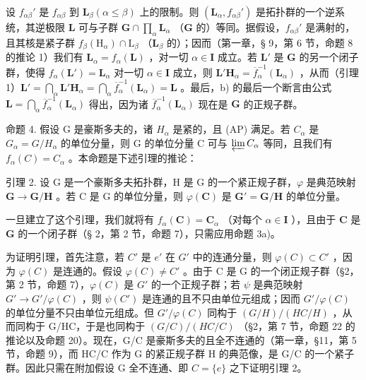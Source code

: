 \begin{enumerate}
  设 \(f_{\alpha \beta}'\) 是 \(f_{\alpha \beta}\) 到 \(\mathbf{L}_{\beta} (\alpha \leqslant \beta)\) 上的限制。则 \((\mathbf{L}_{\alpha}, f_{\alpha \beta}')\) 是拓扑群的一个逆系统，其逆极限 \(\mathbf{L}\) 可与子群 \(\mathbf{G} \cap \prod_{\alpha} \mathbf{L}_{\alpha}\) （\(\mathbf{G}\) 的）等同。据假设，\(f_{\alpha \beta}'\) 是满射的，且其核是紧子群 \(f_{\beta}(\mathrm{H}_{\alpha}) \cap \mathrm{L}_{\beta}\) （\(\mathbf{L}_{\beta}\) 的）；因而（第一章，§ 9，第 6 节，命题 8 的推论 1）我们有 \(\mathbf{L}_{\alpha} = f_{\alpha}(\mathbf{L})\) ，对一切 \(\alpha \in \mathbf{I}\) 成立。若 \(\mathbf{L}'\) 是 \(\mathbf{G}\) 的另一个闭子群，使得 \(f_{\alpha}(\mathbf{L}') = \mathbf{L}_{\alpha}\) 对一切 \(\alpha \in \mathbf{I}\) 成立，则 \(\mathbf{L}'\mathbf{H}_{\alpha} = \overline{f}_{\alpha}^{-1}(\mathbf{L}_{\alpha})\) ，从而（引理 1）\(\mathbf{L}' = \bigcap_{\alpha} \mathbf{L}'\mathbf{H}_{\alpha} = \bigcap_{\alpha} \overline{f}_{\alpha}^{-1}(\mathbf{L}_{\alpha}) = \mathbf{L}\) 。最后，b) 的最后一个断言由公式 \(\mathbf{L} = \bigcap_{\alpha} \overline{f}_{\alpha}^{-1}(\mathbf{L}_{\alpha})\) 得出，因为诸 \(\overline{f}_{\alpha}^{-1}(\mathbf{L}_{\alpha})\) 现在是 \(\mathbf{G}\) 的正规子群。
\end{enumerate}

命题 4. 假设 G 是豪斯多夫的，诸 \(H_{\alpha}\) 是紧的，且 (AP) 满足。若 \(C_{\alpha}\) 是 \(G_{\alpha} = G/H_{\alpha}\) 的单位分量，则 G 的单位分量 C 可与 \(\varprojlim C_{\alpha}\) 等同，且我们有 \(f_{\alpha}(C) = C_{\alpha}\) 。本命题是下述引理的推论：

引理 2. 设 G 是一个豪斯多夫拓扑群，H 是 G 的一个紧正规子群，\(\varphi\) 是典范映射 \(\mathbf{G} \to \mathbf{G} / \mathbf{H}\) 。若 C 是 G 的单位分量，则 \(\varphi(\mathbf{C})\) 是 \(\mathbf{G}' = \mathbf{G} / \mathbf{H}\) 的单位分量。

一旦建立了这个引理，我们就将有 \(f_{\alpha}(\mathbf{C}) = \mathbf{C}_{\alpha}\) （对每个 \(\alpha \in \mathbf{I}\) ），且由于 \(\mathbf{C}\) 是 \(\mathbf{G}\) 的一个闭子群（§ 2，第 2 节，命题 7），只需应用命题 3a)。

为证明引理，首先注意，若 \(C'\) 是 \(e'\) 在 \(G'\) 中的连通分量，则 \(\varphi(C) \subset C'\) ，因为 \(\varphi(C)\) 是连通的。假设 \(\varphi(C) \neq C'\) 。由于 C 是 G 的一个闭正规子群（§2，第 2 节，命题 7），\(\varphi(C)\) 是 \(G'\) 的一个正规子群；若 \(\psi\) 是典范映射 \(G' \to G'/\varphi(C)\) ，则 \(\psi(C')\) 是连通的且不只由单位元组成；因而 \(G'/\varphi(C)\) 的单位分量不只由单位元组成。但 \(G'/\varphi(C)\) 同构于 \((G/H)/(HC/H)\) ，从而同构于 G/HC，于是也同构于 \((G/C)/(HC/C)\) （§2，第 7 节，命题 22 的推论以及命题 20）。现在，G/C 是豪斯多夫的且全不连通的（第一章，§11，第 5 节，命题 9），而 HC/C 作为 G 的紧正规子群 H 的典范像，是 G/C 的一个紧子群。因此只需在附加假设 G 全不连通、即 \(C = \{e\}\) 之下证明引理 2。

